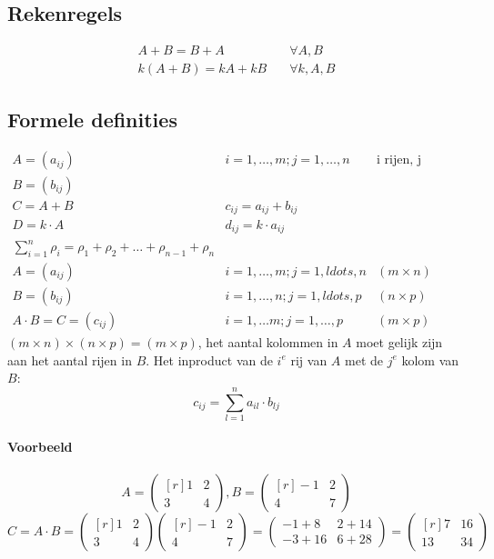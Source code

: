 \subsection{Rekenregels}
\[\begin{array}{ll}
A+B = B+A & \quad \forall A, B \\
k(A+B) = kA+kB & \quad \forall k, A, B
\end{array} \]

\subsection{Formele definities}
\[\begin{array}{lll}

A = (a_{ij}) & i=1, \ldots, m ; j = 1, \ldots, n & \mbox{i rijen, j kolommen} \\
B = (b_{ij}) && \\
C = A+B & c_{ij} = a_{ij}+b_{ij} & \\
D = k \cdot A & d_{ij} = k \cdot a_{ij} \\
\sum\limits_{i=1}^n \rho_i = \rho_1 + \rho_2 + \ldots + \rho_{n-1} + \rho_n && \\
A = (a_{ij}) & i = 1, \ldots, m; j = 1, ldots, n & (m \times n) \\
B = (b_{ij}) & i = 1, \ldots, n; j = 1, ldots, p & (n \times p) \\
A \cdot B = C = (c_{ij}) & i=1, \ldots m; j = 1, \ldots, p & (m \times p)
\end{array} \]
$(m \times n) \times (n \times p) = (m \times p)$, het aantal kolommen in $A$ moet gelijk zijn aan het aantal rijen in $B$. Het inproduct van de $i^e$ rij van $A$ met de $j^e$ kolom van $B$:
\[ c_{ij} = \sum\limits_{l=1}^n a_{il} \cdot b_{lj} \]

\paragraph{Voorbeeld}
\[A = \begin{pmatrix*}[r] 1 & 2 \\ 3 & 4 \end{pmatrix*}, B = \begin{pmatrix*}[r] -1 & 2 \\ 4 & 7 \end{pmatrix*} \]
\[ C = A \cdot B = \begin{pmatrix*}[r] 1 & 2 \\ 3 & 4 \end{pmatrix*} \begin{pmatrix*}[r] -1 & 2 \\ 4 & 7 \end{pmatrix*} = \begin{pmatrix} -1 + 8 & 2+14 \\
-3 + 16 & 6 +28 \end{pmatrix} = \begin{pmatrix*}[r]7 & 16 \\ 13 & 34 \end{pmatrix*} \]

